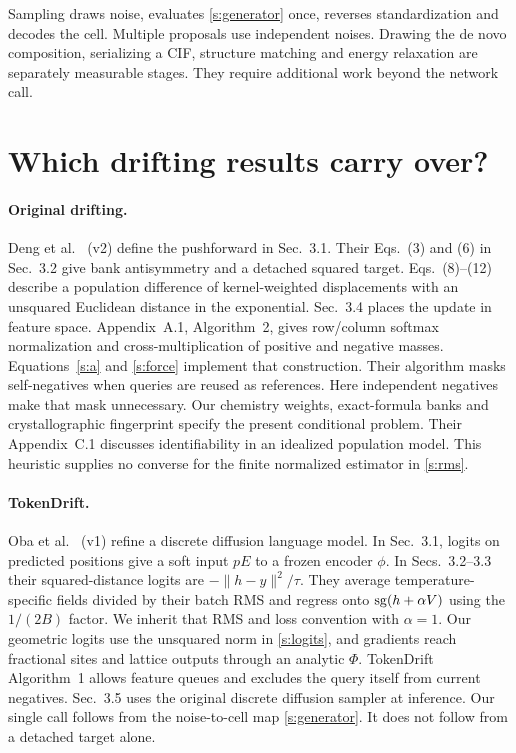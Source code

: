 Sampling draws noise, evaluates \eqref{s:generator} once, reverses standardization and decodes the cell. Multiple proposals use independent noises. Drawing the de novo composition, serializing a CIF, structure matching and energy relaxation are separately measurable stages. They require additional work beyond the network call.

\newpage
\section{Which drifting results carry over?}
\paragraph{Original drifting.}
Deng et al.\ \cite{deng} (v2) define the pushforward in Sec.~3.1. Their Eqs.~(3) and (6) in Sec.~3.2 give bank antisymmetry and a detached squared target. Eqs.~(8)--(12) describe a population difference of kernel-weighted displacements with an unsquared Euclidean distance in the exponential. Sec.~3.4 places the update in feature space. Appendix~A.1, Algorithm~2, gives row/column softmax normalization and cross-multiplication of positive and negative masses. Equations~\eqref{s:a} and \eqref{s:force} implement that construction. Their algorithm masks self-negatives when queries are reused as references. Here independent negatives make that mask unnecessary. Our chemistry weights, exact-formula banks and crystallographic fingerprint specify the present conditional problem. Their Appendix~C.1 discusses identifiability in an idealized population model. This heuristic supplies no converse for the finite normalized estimator in \eqref{s:rms}.

\paragraph{TokenDrift.}
Oba et al.\ \cite{tokendrift} (v1) refine a discrete diffusion language model. In Sec.~3.1, logits on predicted positions give a soft input $pE$ to a frozen encoder $\phi$. In Secs.~3.2--3.3 their squared-distance logits are $-\|h-y\|^2/\tau$. They average temperature-specific fields divided by their batch RMS and regress onto $\operatorname{sg}(h+\alpha V)$ using the $1/(2B)$ factor. We inherit that RMS and loss convention with $\alpha=1$. Our geometric logits use the unsquared norm in \eqref{s:logits}, and gradients reach fractional sites and lattice outputs through an analytic $\Phi$. TokenDrift Algorithm~1 allows feature queues and excludes the query itself from current negatives. Sec.~3.5 uses the original discrete diffusion sampler at inference. Our single call follows from the noise-to-cell map \eqref{s:generator}. It does not follow from a detached target alone.

